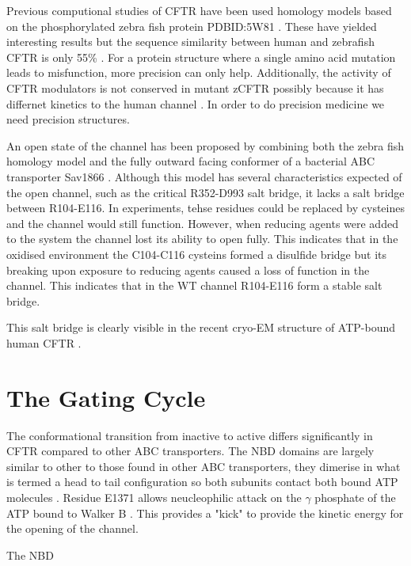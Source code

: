 Previous computional studies of CFTR have been used homology models based on the phosphorylated zebra fish protein PDBID:5W81 \cite{Zhang2017}. These have yielded interesting results but the sequence similarity between human and zebrafish CFTR is only 55\% \cite{}. For a protein structure where a single amino acid mutation leads to misfunction, more precision can only help. Additionally, the activity of CFTR modulators is not conserved in mutant zCFTR possibly because it has differnet kinetics to the human channel \cite{}. In order to do precision medicine we need precision structures. 

An open state of the channel has been proposed by combining both the zebra fish homology model and the fully outward facing conformer of a bacterial ABC transporter Sav1866 \cite{Hoffman2018}. Although this model has several characteristics expected of the open channel, such as the critical R352-D993 salt bridge, it lacks a salt bridge between R104-E116. In experiments, tehse residues could be replaced by cysteines and the channel would still function. However, when reducing agents were added to the system the channel lost its ability to open fully. This indicates that in the oxidised environment the C104-C116 cysteins formed a disulfide bridge but its breaking upon exposure to reducing agents caused a loss of function in the channel. This indicates that in the WT channel R104-E116 form a stable salt bridge. 

This salt bridge is clearly visible in the recent cryo-EM structure of ATP-bound human CFTR \cite{Zhang2018}.

\section{The Gating Cycle}
The conformational transition from inactive to active differs significantly in CFTR compared to other ABC transporters. The NBD domains are largely similar to other to those found in other ABC transporters, they dimerise in what is termed a head to tail configuration so both subunits contact both bound ATP molecules \cite{}. Residue E1371 allows neucleophilic attack on the $\gamma$ phosphate of the ATP bound to Walker B \cite{Stratford2007}. This provides a "kick" to provide the kinetic energy for the opening of the channel. 

The NBD 

